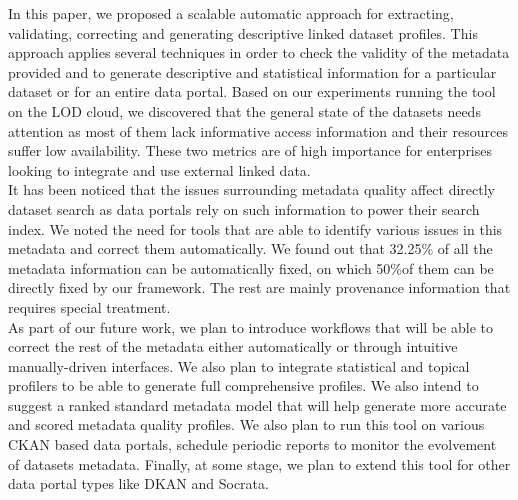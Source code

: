 \documentclass[runningheads,a4paper]{llncs}
\begin{document}
In this paper, we proposed a scalable automatic approach for extracting, validating, correcting and generating descriptive linked dataset profiles. This approach applies several techniques in order to check the validity of the metadata provided and to generate descriptive and statistical information for a particular dataset or for an entire data portal. Based on our experiments running the tool on the LOD cloud, we discovered that the general state of the datasets needs attention as most of them lack informative access information and their resources suffer low availability. These two metrics are of high importance for enterprises looking to integrate and use external linked data.\\
It has been noticed that the issues surrounding metadata quality affect directly dataset search as data portals rely on such information to power their search index. We noted the need for tools that are able to identify various issues in this metadata and correct them automatically. We found out that 32.25\% of all the metadata information can be automatically fixed, on which 50\%of them can be directly fixed by our framework. The rest are mainly provenance information that requires special treatment.\\
As part of our future work, we plan to introduce workflows that will be able to correct the rest of the metadata either automatically or through intuitive manually-driven interfaces. We also plan to integrate statistical and topical profilers to be able to generate full comprehensive profiles. We also intend to suggest a ranked standard metadata model that will help generate more accurate and scored metadata quality profiles. We also plan to run this tool on various CKAN based data portals, schedule periodic reports to monitor the evolvement of datasets metadata. Finally, at some stage, we plan to extend this tool for other data portal types like DKAN and Socrata.



\nocite{*}

\end{document}
